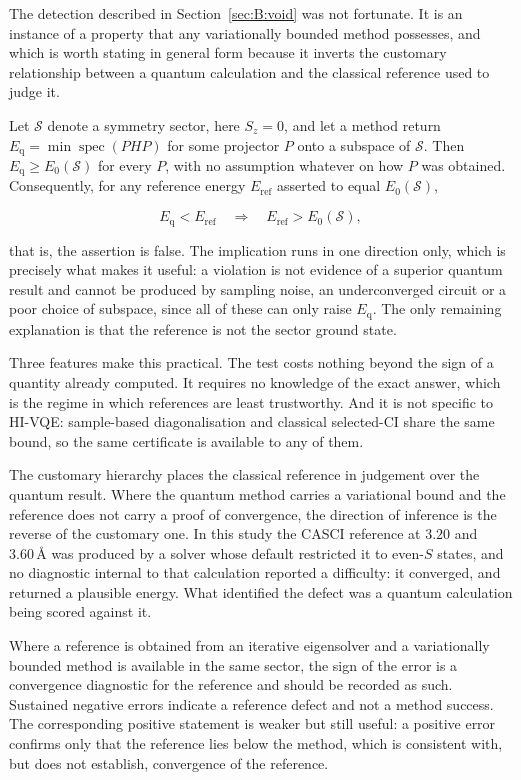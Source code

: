 \documentclass[11pt,a4paper]{article}
\newcommand{\Ang}{\ensuremath{\,\text{\AA}}}
\begin{document}
The detection described in Section~\ref{sec:B:void} was not fortunate. It is an
instance of a property that any variationally bounded method possesses, and
which is worth stating in general form because it inverts the customary
relationship between a quantum calculation and the classical reference used to
judge it.

Let $\mathcal{S}$ denote a symmetry sector, here $S_z = 0$, and let a method
return $E_{\text{q}} = \min \operatorname{spec}(PHP)$ for some projector $P$
onto a subspace of $\mathcal{S}$. Then $E_{\text{q}} \geq E_0(\mathcal{S})$ for
every $P$, with no assumption whatever on how $P$ was obtained. Consequently,
for any reference energy $E_{\text{ref}}$ asserted to equal
$E_0(\mathcal{S})$,

\[
E_{\text{q}} < E_{\text{ref}}
\quad\Longrightarrow\quad
E_{\text{ref}} > E_0(\mathcal{S}),
\]

that is, the assertion is false. The implication runs in one direction only,
which is precisely what makes it useful: a violation is not evidence of a
superior quantum result and cannot be produced by sampling noise, an
underconverged circuit or a poor choice of subspace, since all of these can
only raise $E_{\text{q}}$. The only remaining explanation is that the reference
is not the sector ground state.

Three features make this practical. The test costs nothing beyond the sign of a
quantity already computed. It requires no knowledge of the exact answer, which
is the regime in which references are least trustworthy. And it is not specific
to HI-VQE: sample-based diagonalisation and classical selected-CI share the
same bound, so the same certificate is available to any of them.

The customary hierarchy places the classical reference in judgement over the
quantum result. Where the quantum method carries a variational bound and the
reference does not carry a proof of convergence, the direction of inference is
the reverse of the customary one. In this study the CASCI reference at $3.20$
and $3.60\Ang$ was produced by a solver whose default restricted it to even-$S$
states, and no diagnostic internal to that calculation reported a difficulty:
it converged, and returned a plausible energy. What identified the defect was
a quantum calculation being scored against it.

\begin{result}
Where a reference is obtained from an iterative eigensolver and a variationally
bounded method is available in the same sector, the sign of the error is a
convergence diagnostic for the reference and should be recorded as such.
Sustained negative errors indicate a reference defect and not a method success.
The corresponding positive statement is weaker but still useful: a positive
error confirms only that the reference lies below the method, which is
consistent with, but does not establish, convergence of the reference.
\end{result}
\end{document}
